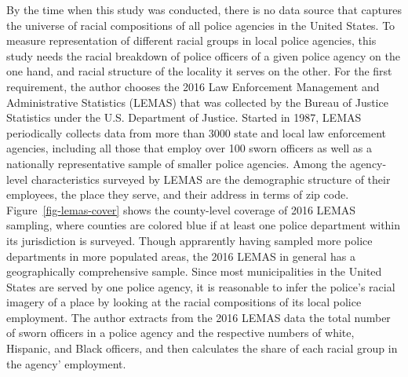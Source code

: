 \documentclass[
  12pt,
]{article}
\begin{document}
By the time when this study was conducted, there is no data source that
captures the universe of racial compositions of all police agencies in
the United States. To measure representation of different racial groups
in local police agencies, this study needs the racial breakdown of
police officers of a given police agency on the one hand, and racial
structure of the locality it serves on the other. For the first
requirement, the author chooses the 2016 Law Enforcement Management and
Administrative Statistics (LEMAS) that was collected by the Bureau of
Justice Statistics under the U.S. Department of Justice. Started in
1987, LEMAS periodically collects data from more than 3000 state and
local law enforcement agencies, including all those that employ over 100
sworn officers as well as a nationally representative sample of smaller
police agencies. Among the agency-level characteristics surveyed by
LEMAS are the demographic structure of their employees, the place they
serve, and their address in terms of zip code.
Figure~\ref{fig-lemas-cover} shows the county-level coverage of 2016
LEMAS sampling, where counties are colored blue if at least one police
department within its jurisdiction is surveyed. Though apprarently
having sampled more police departments in more populated areas, the 2016
LEMAS in general has a geographically comprehensive sample. Since most
municipalities in the United States are served by one police agency, it
is reasonable to infer the police's racial imagery of a place by looking
at the racial compositions of its local police employment. The author
extracts from the 2016 LEMAS data the total number of sworn officers in
a police agency and the respective numbers of white, Hispanic, and Black
officers, and then calculates the share of each racial group in the
agency' employment.
\end{document}
